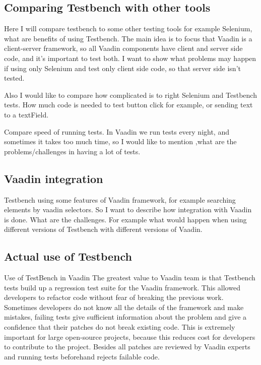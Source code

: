 \documentclass{article}
\begin{document}
   \subsection {Comparing Testbench with other tools}
    Here I will compare testbench to some other testing tools for example
    Selenium, what are benefits of using Testbench. The main idea is to focus
    that Vaadin is a client-server framework, so all Vaadin components have
    client and server side code, and it's important to test both. I want to show
    what problems may happen if using only Selenium and test only client side
    code, so that server side isn't tested. 
    
    Also I would like to compare how complicated is to right Selenium and
    Testbench tests. How much code is needed to test button click for example,
    or sending text to a textField.
    
    Compare speed of running tests. In Vaadin we run tests every night, and
    sometimes it takes too much time, so I would like to mention ,what are the
    problems/challenges in having a lot of tests.
    
   \subsection {Vaadin integration}
    Testbench using some features of Vaadin framework, for example searching
    elements by vaadin selectors. So I want to describe how integration with
    Vaadin is done. What are the challenges. For example what would happen when
    using different versions of Testbench with different versions of Vaadin.
    
   \subsection{Actual use of Testbench}
   Use of TestBench in Vaadin
The greatest value to Vaadin team is that Testbench tests build up a regression test suite for the Vaadin framework. This allowed developers to refactor code without fear of breaking the previous work. Sometimes developers do not know all the details of the framework and make mistakes, failing tests give sufficient information about the problem and give a confidence that their patches do not break existing code.  This is extremely important for large open-source projects, because this reduces cost for developers to contribute to the project. Besides all patches are reviewed by Vaadin experts and running tests beforehand rejects failable code. 
\end{document}
